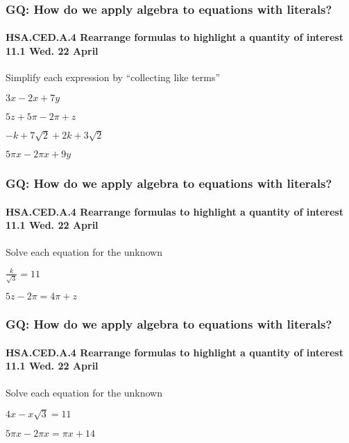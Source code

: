 \documentclass{beamer}
\begin{document}
\frame
{
  \frametitle{GQ: How do we apply algebra to equations with literals?}
  \framesubtitle{HSA.CED.A.4 Rearrange formulas to highlight a quantity of interest \hfill \alert{11.1 Wed. 22 April}}

  Simplify each expression by ``collecting like terms''
\Large{  
  \begin{enumerate}%
    \begin{multicols}{2}
      \item $3x-2x+7y$ \vspace{2cm}
      \item $5z+5\pi-2\pi+z$
      \item $-k+7\sqrt{2}+2k+3\sqrt{2}$ \vspace{2cm}
      \item $5\pi x-2 \pi x +9y$
    \end{multicols}
    \end{enumerate} \vspace{2cm}
}}


\frame
{
  \frametitle{GQ: How do we apply algebra to equations with literals?}
  \framesubtitle{HSA.CED.A.4 Rearrange formulas to highlight a quantity of interest \hfill \alert{11.1 Wed. 22 April}}
  \Large{
  Solve each equation for the unknown
  
  \begin{enumerate}
    \begin{multicols}{2}
      \item $\displaystyle \frac{k}{\sqrt{3}}=11$
      \item $5z-2 \pi = 4\pi +z$
    \end{multicols}
    \end{enumerate} \vspace{7cm}
}}

\frame
{
  \frametitle{GQ: How do we apply algebra to equations with literals?}
  \framesubtitle{HSA.CED.A.4 Rearrange formulas to highlight a quantity of interest \hfill \alert{11.1 Wed. 22 April}}
  \Large{
  Solve each equation for the unknown
  
  \begin{enumerate}%
    \begin{multicols}{2}
      \item $4x-x\sqrt{3}=11$
      \item $5\pi x-2 \pi x= \pi x +14$
    \end{multicols}
    \end{enumerate} \vspace{7cm}
}}
\end{document}
